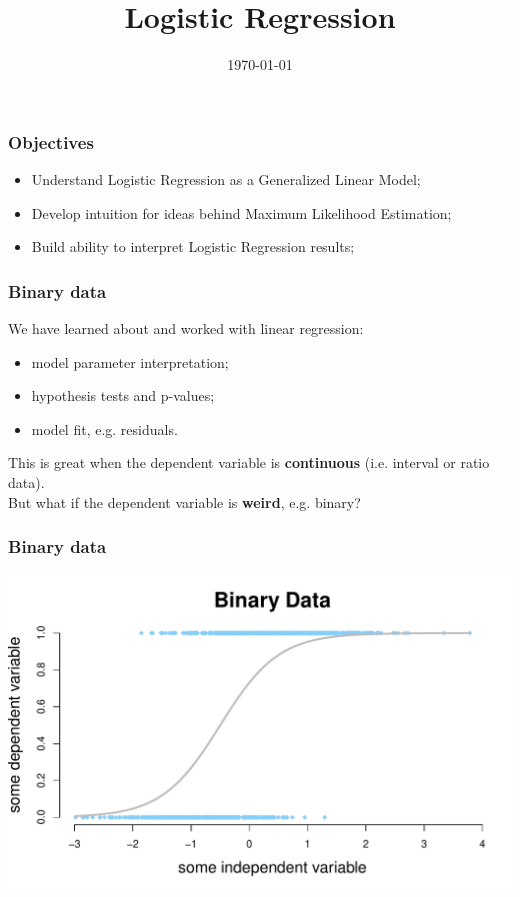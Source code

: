 \documentclass[aspectratio=169]{beamer}
\title{Logistic Regression}
\date{\today}
\begin{document}
{
\begin{frame}
    \maketitle
\end{frame}
}


\begin{frame}
\frametitle{Objectives}
\begin{itemize}
\item Understand Logistic Regression as a Generalized Linear Model;
\bigskip
\bigskip
\item Develop intuition for ideas behind Maximum Likelihood Estimation;
\bigskip
\bigskip
\item Build ability to interpret Logistic Regression results;
\end{itemize}
\end{frame}

\begin{frame}
\frametitle{Binary data}
We have learned about and worked with linear regression:
\bigskip
\begin{itemize}
\item model parameter interpretation;
\bigskip
\item hypothesis tests and p-values;
\bigskip
\item model fit, e.g. residuals.
\bigskip
\end{itemize}
This is great when the dependent variable is \textbf{continuous} (i.e. interval or ratio data).\\
\bigskip
{}But what if the dependent variable is \textbf{weird}, e.g. binary?
\end{frame}

\begin{frame}
\frametitle{Binary data}
\begin{center}
\includegraphics[scale=0.55]{binary_data_w_s_curve.pdf}
\end{center}
\end{frame}
\end{document}
